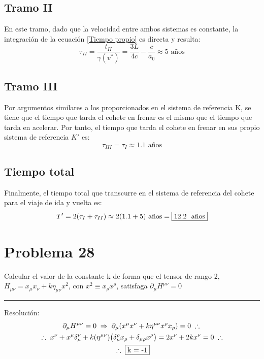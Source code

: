\documentclass[11pt]{article}
\begin{document}
\subsection*{Tramo II}
En este tramo, dado que la velocidad entre ambos sistemas es constante, la integración de la ecuación \eqref{Tiempo propio} es directa y resulta: 
\begin{equation}
    \tau_{II} = \dfrac{t_{II}}{\gamma(v^*)}=\dfrac{3L}{4c} - \dfrac{c}{a_0} \approx 5 \textrm{ años}
\end{equation}
\subsection*{Tramo III}
Por argumentos similares a los proporcionados en el sistema de referencia K, se tiene que el tiempo que tarda el cohete en frenar es el mismo que el tiempo que tarda en acelerar. Por tanto, el tiempo que tarda el cohete en frenar en sus propio sistema de referencia $K'$ es:
\begin{equation}
    \tau_{III} = \tau_I \approx 1.1 \textrm{ años}
\end{equation}
\subsection*{Tiempo total}
Finalmente, el tiempo total que transcurre en el sistema de referencia del cohete para el viaje de ida y vuelta es:
\begin{equation}
    T' = 2(\tau_I + \tau_{II}) \approx 2(1.1 + 5) \textrm{ años} = \fbox{12.2 \textrm{ años}} 
\end{equation}
\section*{Problema 28}
Calcular el valor de la constante k de forma que el tensor de rango 2,
 $H_{\mu\nu} =x_\mu x_\nu +k\eta_{\mu\nu}x^2$, con $x^2 \equiv x_\rho x^\rho$, satisfaga $\partial_\mu H^{\mu\nu} = 0$
 \vspace*{1em}
 \hrule
 \vspace*{1em}
 {\color{blue} Resolución:}\\
 \begin{gather}
    \partial_\mu H^{\mu\nu} = 0 \;\Rightarrow\; \partial_\mu (x^\mu x^\nu + k\eta^{\mu\nu}x^\rho x_\rho) = 0 \;\therefore\;\nonumber\\
    \;\therefore\; x^\nu + x^\mu\delta_\mu^\nu + k\qty(\eta^{\mu\nu})\qty(\delta_\mu^\rho x_\rho + \delta_{\mu\rho}x^\rho) = 2x^\nu + 2kx^\nu = 0 \;\therefore\;\nonumber\\
    \;\therefore\;  \fbox{k = -1}
 \end{gather}
\end{document}
